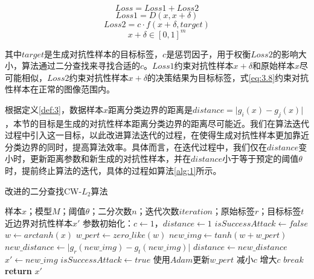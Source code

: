 \begin{equation}
	\label{eq:3.5}
	Loss = Loss1 + Loss2 
\end{equation}
\begin{equation}
	\label{eq:3.6}
	Loss1 = D(x, x + \delta)
\end{equation}
\begin{equation}
	\label{eq:3.7}
	Loss2 = c \cdot f(x + \delta,target)
\end{equation}
\begin{equation}
	\label{eq:3.8}
	x + \delta \in [0,1]^m
\end{equation}

\noindent 其中$target$是生成对抗性样本的目标标签，$c$是惩罚因子，用于权衡$Loss2$的影响大小，算法通过二分查找来寻找合适的$c$。$Loss1$约束对抗性样本$x + \delta$和原始样本$x$尽可能相似，$Loss2$约束对抗性样本$x + \delta$的决策结果为目标标签，式\ref{eq:3.8}约束对抗性样本在正常的图像范围内。

根据定义\ref{def:3}，数据样本$x$距离分类边界的距离是$distance = \vert g_i(x) - g_j(x) \vert$，本节的目标是生成的对抗性样本距离分类边界的距离尽可能近。我们在算法迭代过程中引入这一目标，以此改进算法迭代的过程，在使得生成对抗性样本更加靠近分类边界的同时，提高算法效率。具体而言，在迭代过程中，我们仅在$distance$变小时，更新距离参数和新生成的对抗性样本，并在$distance$小于等于预定的阈值$\theta$时，提前终止算法的迭代，具体的过程如算法\ref{alg:1}所示。

\begin{algorithm}[H] 
	\caption{改进的二分查找CW-$L_2$算法}
	\label{alg:1}
	\begin{algorithmic}[1]
		
		\Require 样本$x$；模型$M$；阈值$\theta$；二分次数$n$；迭代次数$iteration$；原始标签$r$；目标标签$t$
		\Ensure 近边界对抗性样本$x'$
		\State 参数初始化：$c\gets1$，$distance \gets 1$
			\State $isSuccessAttack \gets false$
			\State $w \gets arctanh(x)$
			\State $w\_pert \gets zero\_like(w)$
				\State $new\_img \gets tanh(w + w\_pert)$
				\State $new\_distance \gets \vert g_r(new\_img) - g_t(new\_img) \vert$
					\State $distance \gets new\_distance$
					\State $x' \gets new\_img$
					\State $isSuccessAttack \gets true$
				\EndIf
				\State 使用$Adam$更新$w\_pert$
			\EndFor
			\State 减小$c$
			\Else \State 增大$c$
			\EndIf 
			\State $break$
			\EndIf
		\EndFor
		\State \textbf{return} $x'$
	\end{algorithmic}
\end{algorithm}

